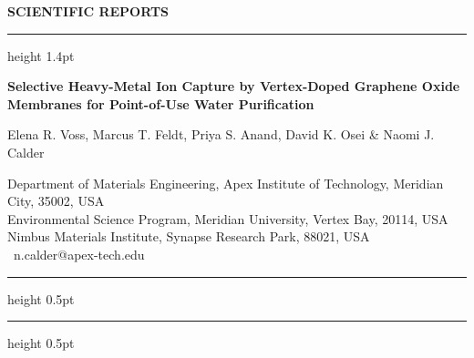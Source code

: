 \documentclass[10pt,a4paper]{article}
\begin{document}
\noindent{}
\vspace{0.8em}


\thispagestyle{fancy}

\noindent
\begin{minipage}{0.72\textwidth}
  {\sffamily\footnotesize\bfseries\color{snCrimson} SCIENTIFIC REPORTS}
\end{minipage}%
\begin{minipage}{0.27\textwidth}
\end{minipage}
\par
\vspace{4pt}
{\color{snCrimson}\hrule height 1.4pt}
\vspace{18pt}

\begin{center}
{\sffamily\LARGE\bfseries\color{snInk}
Selective Heavy-Metal Ion Capture by Vertex-Doped Graphene Oxide Membranes for Point-of-Use Water Purification
}\par
\vspace{14pt}
{\sffamily\normalsize
Elena R. Voss, Marcus T. Feldt, Priya S. Anand, David K. Osei \& Naomi J. Calder
}\par
\vspace{10pt}
{\sffamily\footnotesize\color{snSlate}
Department of Materials Engineering, Apex Institute of Technology, Meridian City, 35002, USA\\
Environmental Science Program, Meridian University, Vertex Bay, 20114, USA\\
Nimbus Materials Institute, Synapse Research Park, 88021, USA\\
\affilnum{*}\faEnvelope\ n.calder@apex-tech.edu
}
\end{center}

\vspace{10pt}
{\color{snSlate!40}\hrule height 0.5pt}
\vspace{12pt}



\vspace{6pt}
{\color{snSlate!40}\hrule height 0.5pt}
\vspace{16pt}







\clearpage
\printbibliography[title={References}]
\end{document}
